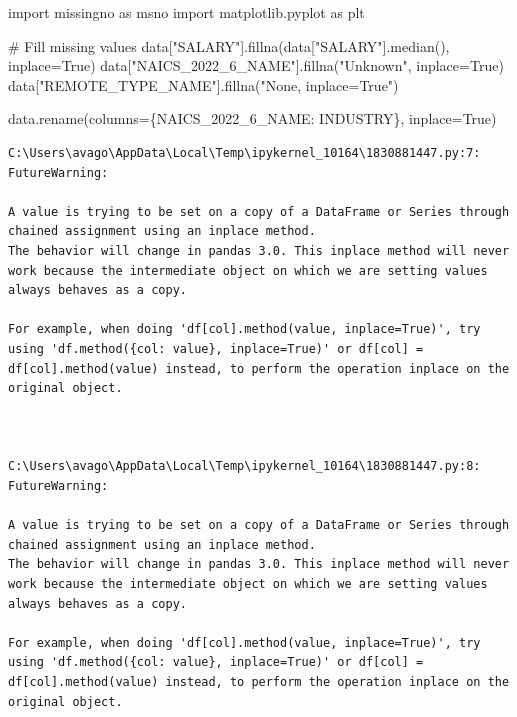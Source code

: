 \documentclass[
  letterpaper,
  DIV=11,
  numbers=noendperiod]{scrartcl}
\newenvironment{Shaded}{\begin{snugshade}}{\end{snugshade}}
\newcommand{\CommentTok}[1]{\textcolor[rgb]{0.37,0.37,0.37}{#1}}
\newcommand{\ImportTok}[1]{\textcolor[rgb]{0.00,0.46,0.62}{#1}}
\newcommand{\NormalTok}[1]{\textcolor[rgb]{0.00,0.23,0.31}{#1}}
\newcommand{\OperatorTok}[1]{\textcolor[rgb]{0.37,0.37,0.37}{#1}}
\newcommand{\StringTok}[1]{\textcolor[rgb]{0.13,0.47,0.30}{#1}}
\newcommand{\VariableTok}[1]{\textcolor[rgb]{0.07,0.07,0.07}{#1}}
\begin{document}
\begin{Shaded}
\begin{Highlighting}[]
\ImportTok{import}\NormalTok{ missingno }\ImportTok{as}\NormalTok{ msno}
\ImportTok{import}\NormalTok{ matplotlib.pyplot }\ImportTok{as}\NormalTok{ plt}



\CommentTok{\# Fill missing values}
\NormalTok{data[}\StringTok{"SALARY"}\NormalTok{].fillna(data[}\StringTok{"SALARY"}\NormalTok{].median(), inplace}\OperatorTok{=}\VariableTok{True}\NormalTok{)}
\NormalTok{data[}\StringTok{"NAICS\_2022\_6\_NAME"}\NormalTok{].fillna(}\StringTok{"Unknown"}\NormalTok{, inplace}\OperatorTok{=}\VariableTok{True}\NormalTok{)}
\NormalTok{data[}\StringTok{"REMOTE\_TYPE\_NAME"}\NormalTok{].fillna(}\StringTok{"None, inplace=True"}\NormalTok{)}

\NormalTok{data.rename(columns}\OperatorTok{=}\NormalTok{\{}\StringTok{\textquotesingle{}NAICS\_2022\_6\_NAME\textquotesingle{}}\NormalTok{: }\StringTok{\textquotesingle{}INDUSTRY\textquotesingle{}}\NormalTok{\}, inplace}\OperatorTok{=}\VariableTok{True}\NormalTok{)}
\end{Highlighting}
\end{Shaded}

\begin{verbatim}
C:\Users\avago\AppData\Local\Temp\ipykernel_10164\1830881447.py:7: FutureWarning:

A value is trying to be set on a copy of a DataFrame or Series through chained assignment using an inplace method.
The behavior will change in pandas 3.0. This inplace method will never work because the intermediate object on which we are setting values always behaves as a copy.

For example, when doing 'df[col].method(value, inplace=True)', try using 'df.method({col: value}, inplace=True)' or df[col] = df[col].method(value) instead, to perform the operation inplace on the original object.



C:\Users\avago\AppData\Local\Temp\ipykernel_10164\1830881447.py:8: FutureWarning:

A value is trying to be set on a copy of a DataFrame or Series through chained assignment using an inplace method.
The behavior will change in pandas 3.0. This inplace method will never work because the intermediate object on which we are setting values always behaves as a copy.

For example, when doing 'df[col].method(value, inplace=True)', try using 'df.method({col: value}, inplace=True)' or df[col] = df[col].method(value) instead, to perform the operation inplace on the original object.


\end{verbatim}
\end{document}
